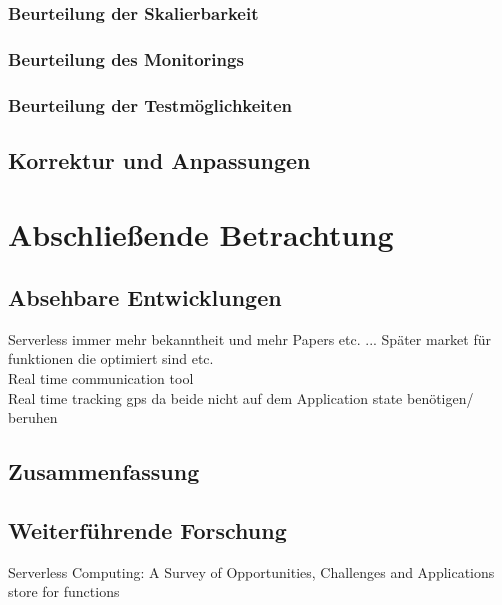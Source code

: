 \documentclass[11pt]{article}
\begin{document}
\subsubsection{Beurteilung der Skalierbarkeit} 
\subsubsection{Beurteilung des Monitorings}
\subsubsection{Beurteilung der Testmöglichkeiten} 
\subsection{Korrektur und Anpassungen}
\section{Abschließende Betrachtung}
\subsection{Absehbare Entwicklungen}
\cite{al2019systematic} Serverless  immer mehr bekanntheit und mehr Papers etc. ... Später market für funktionen die optimiert sind etc. \cite{shafiei2020serverless}\\
Real time communication tool  \cite{shafiei2020serverless} \\
Real time tracking gps  \cite{shafiei2020serverless} da beide nicht auf dem Application state benötigen/ beruhen  \cite{shafiei2020serverless} \\
\cite{hellerstein2018serverless}
\subsection{Zusammenfassung}
\subsection{Weiterführende Forschung}
Serverless Computing: A Survey of Opportunities, Challenges and Applications store for functions
\cite{shahrad2019architectural}
\newpage
\printbibliography%
\end{document}
